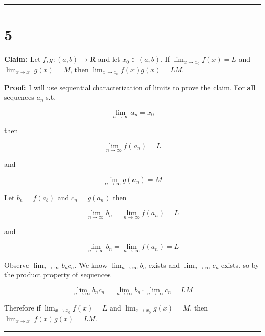 \documentclass[10pt,letterpaper]{article}
\newcommand\R{\mathbf{R}}
\newcommand\ds{\displaystyle}
\newcommand\qedsym{\hfill \rule{2mm}{2mm}}
\begin{document}
\qedsym

\section*{5}

\textbf{Claim:} Let $f,g:(a, b)\rightarrow\R$ and let $x_0\in(a, b)$. If $\ds\lim_{x\to x_0} f(x) = L$ and $\ds\lim_{x\to x_0} g(x) = M$, then $\ds\lim_{x\to x_0} f(x)g(x) = LM$.

\medskip

\textbf{Proof:} I will use sequential characterization of limits to prove the claim. For \textbf{all} sequences $a_n$ s.t.

\[\ds\lim_{n\to\infty} a_n = x_0\]

then 

\[\ds\lim_{n\to\infty}f(a_n) = L\]

and

\[\ds\lim_{n\to\infty}g(a_n) = M\]

Let $b_n = f(a_b)$ and $c_n = g(a_n)$ then

\[\ds\lim_{n\to\infty}b_n = \ds\lim_{n\to\infty}f(a_n) = L\]

and

\[\ds\lim_{n\to\infty}b_n = \ds\lim_{n\to\infty}f(a_n) = L\]

Observe $\ds\lim_{n\to\infty}b_nc_n$. We know $\ds\lim_{n\to\infty}b_n$ exists and $\ds\lim_{n\to\infty}c_n$ exists, so by the product property of sequences

\[\ds\lim_{n\to\infty}b_nc_n = \ds\lim_{n\to\infty}b_n \cdot \ds\lim_{n\to\infty}c_n = LM\]

Therefore if $\ds\lim_{x\to x_0} f(x) = L$ and $\ds\lim_{x\to x_0} g(x) = M$, then $\ds\lim_{x\to x_0} f(x)g(x) = LM$.

\qedsym
\end{document}
